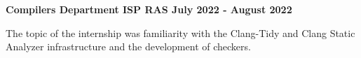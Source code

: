 \textbf{{Compilers Department ISP RAS} \hfill July 2022 - August 2022} \par

\begin{itemize}
    The topic of the internship was familiarity with the Clang-Tidy and Clang Static Analyzer infrastructure and the development of checkers.
\end{itemize} \par